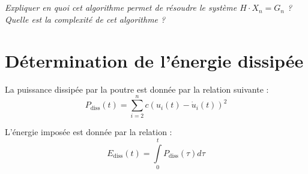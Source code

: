 \documentclass[10pt]{article}
\newif\ifprof
\begin{document}
\subparagraph{}
\textit{Expliquer en quoi cet algorithme permet de résoudre le système $H\cdot X_n = G_n$ ? Quelle est la complexité de cet algorithme ?}
\ifprof
\begin{corrige}
\end{corrige}
\else
\fi


\section{Détermination de l'énergie dissipée}
La puissance dissipée par la poutre est donnée par la relation suivante :
$$
P_{\text{diss}}(t) = \sum\limits_{i=2}^n c\left(u_i(t) - \dot{u}_i(t)\right)^2
$$

L'énergie imposée est donnée par la relation : 
$$
E_{\text{diss}}(t) = \int\limits_{0}^t P_{\text{diss}}(\tau) d\tau
$$
\end{document}
